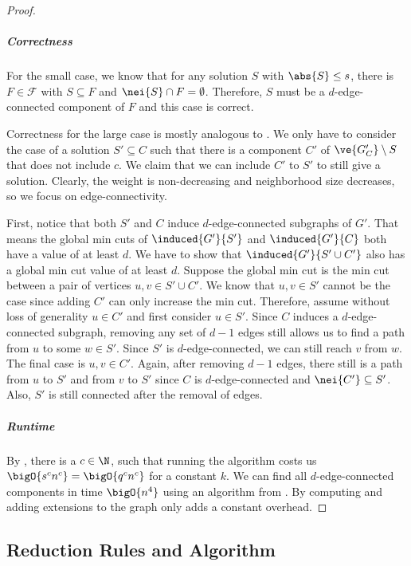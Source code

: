 \begin{lemma}
\begin{lemma}
\begin{lemma}
\begin{lemma}
\begin{lemma}
\begin{theorem}
\begin{proof}
  \subparagraph*{Correctness}

  For the small case, we know that for any solution $S$ with $\abs{S} \le s$, there is $F \in \mathcal{F}$ with $S \subseteq F$ and $\nei{S} \cap F = \emptyset$. Therefore, $S$ must be a $d$-edge-connected component of $F$ and this case is correct.

  Correctness for the large case is mostly analogous to . We only have to consider the case of a solution $S' \subseteq C$ such that there is a component $C'$ of $\ve{G'_C} \setminus S$ that does not include $c$. We claim that we can include $C'$ to $S'$ to still give a solution. Clearly, the weight is non-decreasing and neighborhood size decreases, so we focus on edge-connectivity.

  First, notice that both $S'$ and $C$ induce $d$-edge-connected subgraphs of $G'$. That means the global min cuts of $\induced{G'}{S'}$ and $\induced{G'}{C}$ both have a value of at least $d$. We have to show that $\induced{G'}{S' \cup C'}$ also has a global min cut value of at least $d$. Suppose the global min cut is the min cut between a pair of vertices $u, v \in S' \cup C'$. We know that $u,v \in S'$ cannot be the case since adding $C'$ can only increase the min cut. Therefore, assume without loss of generality $u \in C'$ and first consider $u \in S'$. Since $C$ induces a $d$-edge-connected subgraph, removing any set of $d-1$ edges still allows us to find a path from $u$ to some $w \in S'$. Since $S'$ is $d$-edge-connected, we can still reach $v$ from $w$.
  The final case is $u, v \in C'$. Again, after removing $d-1$ edges, there still is a path from $u$ to $S'$ and from $v$ to $S'$ since $C$ is $d$-edge-connected and $\nei{C'} \subseteq S'$. Also, $S'$ is still connected after the removal of edges.

  \subparagraph*{Runtime} By , there is a $c \in \N$, such that running the algorithm costs us $\bigO{s^cn^c} = \bigO{q^cn^c}$ for a constant $k$. We can find all $d$-edge-connected components in time $\bigO{n^4}$ using an algorithm from \cite{wang2015simple}. By  computing and adding extensions to the graph only adds a constant overhead.
\end{proof}
\fi

\subsection{Reduction Rules and Algorithm}\label{sec:d_edge_algorithm}


\end{theorem}
\end{lemma}
\end{lemma}
\end{lemma}
\end{lemma}
\end{lemma}
